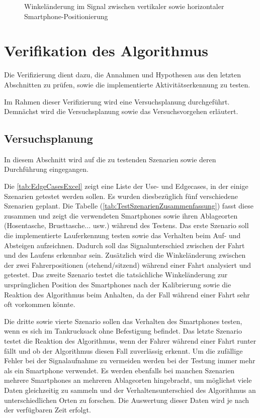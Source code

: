 \begin{figure}
	\centering
	\caption{Winkeländerung im Signal zwischen vertikaler sowie horizontaler Smartphone-Positionierung}
	\label{fig:SignalHorizontalUndVertikal}
\end{figure}



\section{Verifikation des Algorithmus}
Die Verifizierung dient dazu, die Annahmen und Hypothesen aus den letzten Abschnitten zu prüfen, sowie die implementierte Aktivitätserkennung zu testen.


Im Rahmen dieser Verifizierung wird eine Versuchsplanung durchgeführt. Demnächst wird die Versuchsplanung sowie das Versuchsvorgehen erläutert.
%
%
%
\subsection{Versuchsplanung} \label{ab:Versuchsplanung}

In diesem Abschnitt wird auf die zu testenden Szenarien sowie deren Durchführung eingegangen.

Die \autoref{tab:EdgeCasesExcel} zeigt eine Liste der Use- und Edgecases, in der einige Szenarien getestet werden sollen. Es wurden diesbezüglich fünf verschiedene Szenarien geplant.
Die Tabelle (\autoref{tab:TestSzenarienZusammenfassung}) fasst diese zusammen und zeigt die verwendeten Smartphones sowie ihren Ablageorten (Hosentasche, Brusttasche... usw.) während des Testens. Das erste Szenario soll die implementierte Lauferkennung testen sowie das Verhalten beim Auf- und Absteigen aufzeichnen. Dadurch soll das Signalunterschied zwischen der Fahrt und des Laufens erkennbar sein.
Zusätzlich wird die Winkeländerung zwischen der zwei Fahrerpositionen (stehend/sitzend) während einer Fahrt analysiert und getestet.
Das zweite Szenario testet die tatsächliche Winkeländerung zur ursprünglichen Position des Smartphones nach der Kalibrierung sowie die Reaktion des Algorithmus beim Anhalten, da der Fall während einer Fahrt sehr oft vorkommen könnte.

Die dritte sowie vierte Szenario sollen das Verhalten des Smartphones testen, wenn es sich im Tankrucksack ohne Befestigung befindet.
Das letzte Szenario testet die Reaktion des Algorithmus, wenn der Fahrer während einer Fahrt runter fällt und ob der Algorithmus diesen Fall zuverlässig erkennt.
Um die zufällige Fehler bei der Signalaufnahme zu vermeiden werden bei der Testung immer mehr als ein Smartphone verwendet.
Es werden ebenfalls bei manchen Szenarien mehrere Smartphones an mehreren Ablageorten hingebracht, um möglichst viele Daten gleichzeitig zu sammeln und der Verhaltensunterschied des Algorithmus an unterschiedlichen Orten zu forschen.
Die Auswertung dieser Daten wird je nach der verfügbaren Zeit erfolgt.

